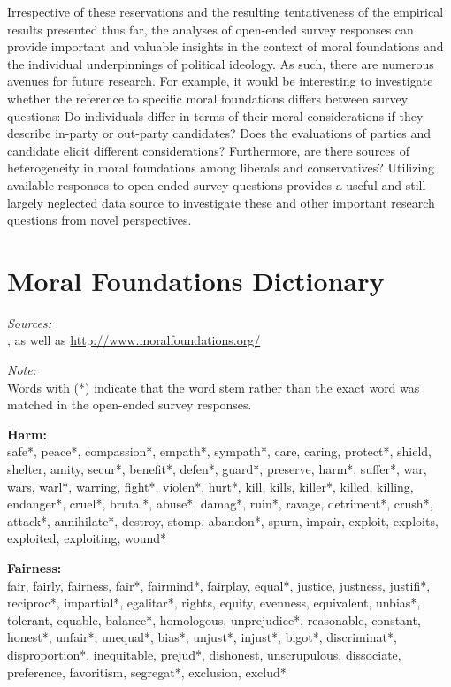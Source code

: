 \documentclass[12pt]{article}
\begin{document}
Irrespective of these reservations and the resulting tentativeness of the empirical results presented thus far, the analyses of open-ended survey responses can provide important and valuable insights in the context of moral foundations and the individual underpinnings of political ideology. As such, there are numerous avenues for future research. For example, it would be interesting to investigate whether the reference to specific moral foundations differs between survey questions: Do individuals differ in terms of their moral considerations if they describe in-party or out-party candidates? Does the evaluations of parties and candidate elicit different considerations? Furthermore, are there sources of heterogeneity in moral foundations among liberals and conservatives? Utilizing available responses to open-ended survey questions provides a useful and still largely neglected data source to investigate these and other important research questions from novel perspectives.


\clearpage\flushleft\footnotesize
\appendices
\section{Moral Foundations Dictionary}
\renewcommand\thefigure{\thesection.\arabic{figure}}
\renewcommand\thetable{\thesection.\arabic{table}}
\setcounter{figure}{0}
\setcounter{table}{0}

\textit{Sources:}\\
\citet{graham2009liberals}, as well as \url{http://www.moralfoundations.org/}
\vspace{.5cm}

\textit{Note:}\\
Words with (*) indicate that the word stem rather than the exact word was matched in the open-ended survey responses.
\vspace{.5cm}

\textbf{Harm:}\\
safe*, peace*, compassion*, empath*, sympath*, care, caring, protect*, shield, shelter, amity, secur*, benefit*, defen*, guard*, preserve, harm*, suffer*, war, wars, warl*, warring, fight*, violen*, hurt*, kill, kills, killer*, killed, killing, endanger*, cruel*, brutal*, abuse*, damag*, ruin*, ravage, detriment*, crush*, attack*, annihilate*, destroy, stomp, abandon*, spurn, impair, exploit, exploits, exploited, exploiting, wound*
\vspace{.5cm}

\textbf{Fairness:}\\
fair, fairly, fairness, fair*, fairmind*, fairplay, equal*, justice, justness, justifi*, reciproc*, impartial*, egalitar*, rights, equity, evenness, equivalent, unbias*, tolerant, equable, balance*, homologous, unprejudice*, reasonable, constant, honest*, unfair*, unequal*, bias*, unjust*, injust*, bigot*, discriminat*, disproportion*, inequitable, prejud*, dishonest, unscrupulous, dissociate, preference, favoritism, segregat*, exclusion, exclud*
\vspace{.5cm}
\end{document}
